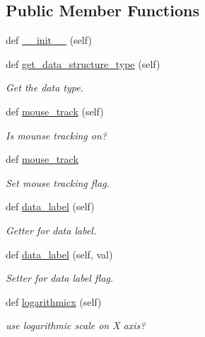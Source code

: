 \subsection*{Public Member Functions}
\begin{DoxyCompactItemize}
\item 
def \hyperlink{classbridges_1_1line__chart_1_1_line_chart_a20c96d892b92624aa367710c9b4386fa}{\+\_\+\+\_\+init\+\_\+\+\_\+} (self)
\item 
def \hyperlink{classbridges_1_1line__chart_1_1_line_chart_a8124cb8693d6564a64264747d6ca5021}{get\+\_\+data\+\_\+structure\+\_\+type} (self)
\begin{DoxyCompactList}\small\item\em Get the data type. \end{DoxyCompactList}\item 
def \hyperlink{classbridges_1_1line__chart_1_1_line_chart_a363767606e7ea91f328aaaf78c6a7bb3}{mouse\+\_\+track} (self)
\begin{DoxyCompactList}\small\item\em Is mounse tracking on? \end{DoxyCompactList}\item 
def \hyperlink{classbridges_1_1line__chart_1_1_line_chart_a7dce5c3d15e13d1224c76551a4908adf}{mouse\+\_\+track}
\begin{DoxyCompactList}\small\item\em Set mouse tracking flag. \end{DoxyCompactList}\item 
def \hyperlink{classbridges_1_1line__chart_1_1_line_chart_a0b93e3215dbaefa1e24bd2881393014c}{data\+\_\+label} (self)
\begin{DoxyCompactList}\small\item\em Getter for data label. \end{DoxyCompactList}\item 
def \hyperlink{classbridges_1_1line__chart_1_1_line_chart_a92796d1738604f9d6417fa7eebb4352e}{data\+\_\+label} (self, val)
\begin{DoxyCompactList}\small\item\em Setter for data label flag. \end{DoxyCompactList}\item 
def \hyperlink{classbridges_1_1line__chart_1_1_line_chart_a7f2d2f772e00af6ce08aa40e1efb195c}{logarithmicx} (self)
\begin{DoxyCompactList}\small\item\em use logarithmic scale on X axis? \end{DoxyCompactList}\item 

\end{DoxyCompactItemize}
